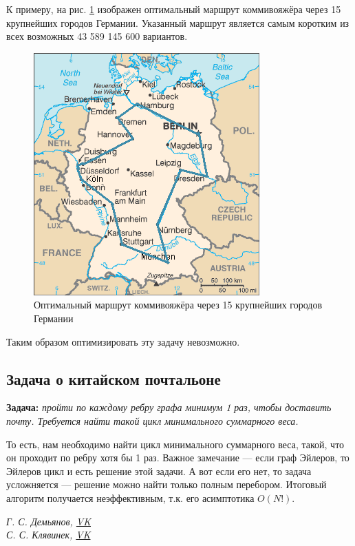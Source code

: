 \documentclass[a4paper,12pt]{article}
\theoremstyle{plain} %
\theoremstyle{definition} %
\theoremstyle{remark} %
\begin{document}
К примеру, на рис. \ref{ris1} изображен оптимальный маршрут коммивояжёра через 15 крупнейших городов Германии. Указанный маршрут является самым коротким из всех возможных 43 589 145 600 вариантов.
\begin{figure}[h!]
	\centering
	\includegraphics[width=0.5\linewidth]{germany}
	\caption{Оптимальный маршрут коммивояжёра через 15 крупнейших городов Германии}
	\label{ris1}
\end{figure}

Таким образом оптимизировать эту задачу невозможно.

\subsection{Задача о китайском почтальоне}
\textbf{Задача:} \emph{пройти по каждому ребру графа минимум 1 раз, чтобы доставить почту. Требуется найти такой цикл минимального суммарного веса.}

То есть, нам необходимо найти цикл минимального суммарного веса, такой, что он проходит по ребру хотя бы 1 раз. Важное замечание --- если граф Эйлеров, то Эйлеров цикл и есть решение этой задачи. А вот если его нет, то задача усложняется --- решение можно найти только полным перебором. Итоговый алгоритм получается неэффективным, т.к. его асимптотика $O(N!)$.










\begin{center}
	\vfill \emph{{\small Г. С. Демьянов, \href{https://vk.com/id37346992}{VK}\\
С. С. Клявинек, \href{https://vk.com/id85132547}{VK}
}}
\end{center}
\end{document}
